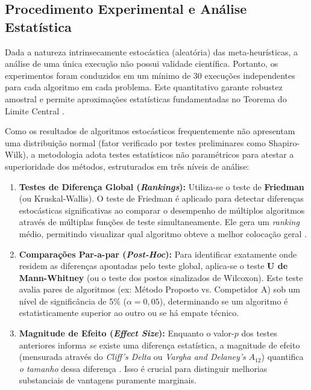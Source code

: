 \documentclass[12pt, a4paper, oneside]{report}
\begin{document}
\subsection{Procedimento Experimental e Análise Estatística}

Dada a natureza intrinsecamente estocástica (aleatória) das meta-heurísticas, a análise de uma única execução não possui validade científica. Portanto, os experimentos foram conduzidos em um mínimo de 30 execuções independentes para cada algoritmo em cada problema. Este quantitativo garante robustez amostral e permite aproximações estatísticas fundamentadas no Teorema do Limite Central \citep{ismail2026beyond, zhong2022beluga}.

Como os resultados de algoritmos estocásticos frequentemente não apresentam uma distribuição normal (fator verificado por testes preliminares como Shapiro-Wilk), a metodologia adota testes estatísticos não paramétricos para atestar a superioridade dos métodos, estruturados em três níveis de análise:

\begin{enumerate}
    \item \textbf{Testes de Diferença Global (\textit{Rankings}):} Utiliza-se o teste de \textbf{Friedman} (ou Kruskal-Wallis). O teste de Friedman é aplicado para detectar diferenças estocásticas significativas ao comparar o desempenho de múltiplos algoritmos através de múltiplas funções de teste simultaneamente. Ele gera um \textit{ranking} médio, permitindo visualizar qual algoritmo obteve a melhor colocação geral \cite{demsar2006statistical}.
    \item \textbf{Comparações Par-a-par (\textit{Post-Hoc}):} Para identificar exatamente onde residem as diferenças apontadas pelo teste global, aplica-se o teste \textbf{U de Mann-Whitney} (ou o teste dos postos sinalizados de Wilcoxon). Este teste avalia pares de algoritmos (ex: Método Proposto vs. Competidor A) sob um nível de significância de 5\% ($\alpha = 0,05$), determinando se um algoritmo é estatisticamente superior ao outro ou se há empate técnico.
    \item \textbf{Magnitude de Efeito (\textit{Effect Size}):} Enquanto o valor-$p$ dos testes anteriores informa \textit{se} existe uma diferença estatística, a magnitude de efeito (mensurada através do \textit{Cliff's Delta} ou \textit{Vargha and Delaney's} $A_{12}$) quantifica \textit{o tamanho} dessa diferença \citep{ismail2026beyond}. Isso é crucial para distinguir melhorias substanciais de vantagens puramente marginais.
\end{enumerate}
\end{document}
